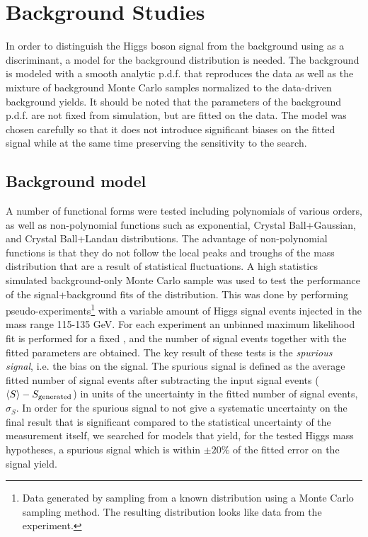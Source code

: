 \section{Background Studies}
 \label{sec:background}
In order to distinguish the Higgs boson signal from the background using \dm
as a discriminant, a model for the background distribution is needed. The background
is modeled with a smooth analytic p.d.f. that reproduces the data as well as the 
mixture of background Monte Carlo samples normalized to the data-driven background 
yields. It should be noted that the parameters of the background p.d.f. are not fixed
from simulation, but are fitted on the data. The model was chosen carefully so that
it does not introduce significant biases on the fitted signal while at the same
time preserving the sensitivity to the search.

\subsection{Background model}
A number of functional forms were tested including polynomials of various orders,
as well as non-polynomial functions such as exponential, Crystal Ball+Gaussian,
and Crystal Ball+Landau distributions. The advantage of non-polynomial functions
is that they do not follow the local peaks and troughs of the mass distribution 
that are a result of statistical fluctuations. A high statistics simulated
background-only Monte Carlo sample was used to test the performance of the
signal+background fits of the \dm distribution. This was done by performing
pseudo-experiments\footnote{Data generated by sampling from a known distribution
using a Monte Carlo sampling method. 
The resulting distribution looks like data from the experiment.} 
with a variable amount of Higgs signal events injected in
the mass range 115-135 GeV. For each experiment an unbinned maximum likelihood
fit is performed for a fixed \mllg, and the number of signal events together
with the fitted parameters are obtained. The key result of these tests is
the \emph{spurious signal}, i.e. the bias on the signal. The spurious signal
is defined as the average fitted number of signal events after subtracting
the input signal events ($\langle S\rangle - S_{\text{generated}}$) in units of the
uncertainty in the fitted number of signal events, $\sigma_S$. In order for the
spurious signal to not give a systematic uncertainty on the final result
that is significant compared to the statistical uncertainty of the measurement
itself, we searched for models that yield, for the tested Higgs mass hypotheses,
a spurious signal which is within $\pm20\%$ of the fitted error on the signal yield.

